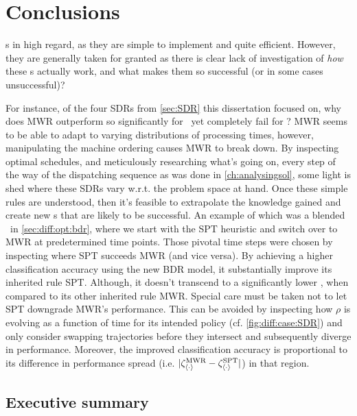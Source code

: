 
\chapter{Conclusions}\label{ch:conclusions} 
 \sdr s in high regard, as they 
are simple to implement and quite efficient. 
However, they are generally taken for granted as there is clear lack of 
investigation of \emph{how} these \dr s actually work, and what 
makes them so successful (or in some cases unsuccessful)? 

For instance, of the four SDRs from \cref{sec:SDR} this dissertation focused 
on, why does MWR outperform so significantly for \jsp\, yet completely fail for 
\fsp? 
MWR seems to be able to adapt to varying distributions of processing times, 
however, manipulating the machine ordering causes MWR to break down. 
By inspecting optimal schedules, and meticulously researching what's going on, 
every step of the way of the dispatching sequence as was done in 
\cref{ch:analysingsol}, some light is shed where these SDRs vary w.r.t. the 
problem space at hand. 
Once these simple rules are understood, then it's feasible to extrapolate the 
knowledge gained and create new \cdr s that are likely to be successful. 
An example of which was a blended \dr\ in \cref{sec:diff:opt:bdr}, where we 
start with the SPT heuristic and switch over to MWR at predetermined time 
points. Those pivotal time steps were chosen by inspecting where SPT succeeds 
MWR (and vice versa). 
By achieving a higher classification accuracy using the new BDR model, it 
substantially improve its inherited rule SPT.
Although, it doesn't transcend to a significantly lower \namerho, when compared 
to its other inherited rule MWR. 
Special care must be taken not to let SPT downgrade MWR's performance. This can 
be avoided by inspecting how $\rho$ is evolving as a function of time for its 
intended policy (cf. \cref{fig:diff:case:SDR}) and only consider swapping 
trajectories before they intersect and subsequently diverge in performance. 
Moreover, the improved classification accuracy is proportional to its 
difference in performance spread (i.e. 
$\lvert\zeta^{\text{MWR}}_{\langle \cdot \rangle} - \zeta^{\text{SPT}}_{\langle \cdot \rangle}\rvert$) in that region.

\section{Executive summary}

